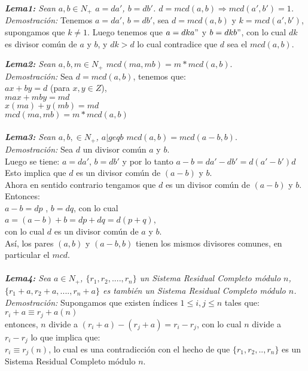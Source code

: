 \documentclass[12pt]{article}
\begin{document}
\textit{\textbf{Lema1:} Sean $a,b\in N_+$ $a = da'$, $b= db'$. $d = mcd(a,b)\Rightarrow mcd(a',b')=1$.}\\
\textit{Demostraci\'on:} Tenemos $a = da'$, $b= db'$, sea $d = mcd(a,b)$ y $k=mcd(a',b')$, supongamos que $k\neq 1$. Luego tenemos que 
$a = dka"$ y $b = dkb"$, con lo cual $dk$ es divisor com\'un de $a$ y $b$, y $dk>d$ lo cual contradice que $d$ sea el $mcd(a,b)$.

\textit{\textbf{Lema2:} Sean $a,b,m\in N_+$ $mcd(ma,mb) = m*mcd(a,b)$}.\\
\textit{Demostraci\'on:} Sea $d = mcd(a,b)$, tenemos que:\\
 $ax + by = d$ (para $x,y\in Z$),\\
 $max + mby = md$\\
 $x(ma) + y(mb) = md$\\
 $mcd(ma,mb) = m*mcd(a,b)$\\
\\

\textit{\textbf{Lema3:} Sean $a,b,\in N_+$, $a|geq b$ $mcd(a,b) = mcd(a-b,b)$}.\\
\textit{Demostraci\'on:}
Sea $d$ un divisor común $a$ y $b$.\\
Luego se tiene: $a = da'$, $b = db'$ y por lo tanto
$a - b = da' - db' = d(a' - b') d$\\
Esto implica que $d$ es un divisor común de $(a - b)$ y $b$.\\
Ahora en sentido contrario tengamos que $d$ es un divisor común de $(a - b)$ y $b$.\\
 Entonces:\\
 $a - b = dp$ , $b = dq$, con lo cual\\
$a = (a - b) + b = dp + dq = d(p + q) $,\\
con lo cual $d$ es un divisor común de $a$ y $b$.\\
Así, los pares $(a, b)$ y $(a - b, b)$ tienen los mismos divisores comunes, en particular el $mcd$.\\
\\

\textit{\textbf{Lema4:} Sea $a\in N_+$, $\{r_1,r_2,....,r_{n}\}$ un Sistema Residual Completo m\'odulo $n$, 
$\{r_1 +a, r_2 + a,...., r_{n}+a\}$ es tambi\'en un Sistema Residual Completo m\'odulo $n$.}\\
\textit{Demostraci\'on:} Supongamos que existen \'indices $1\leq i,j\leq n$ tales que:\\
$ r_i + a \equiv r_j + a (n)$\\
entonces, $n$ divide  a $(r_i + a) - (r_j+a) = r_i-r_j$, con lo cual $n$ divide a $r_i-r_j$ lo que implica que:\\
$ r_i\equiv r_j(n)$, lo cual es una contradicci\'on con el hecho de que $\{r_1,r_2,..,r_n\}$ es un Sistema Residual Completo m\'odulo $n$.\\
\\
\end{document}
